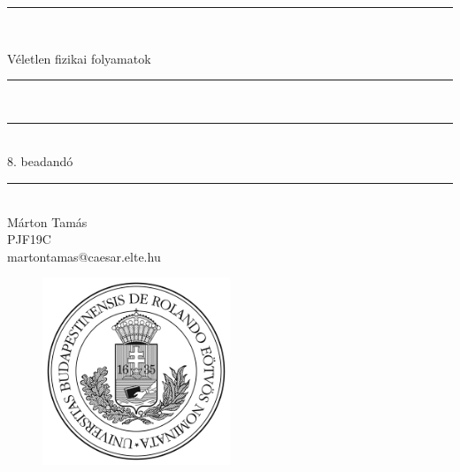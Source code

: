 \documentclass[a4paper, 12pt]{article}
\numberwithin{equation}{section}          %
\numberwithin{figure}{subsection}
\begin{document}
\begin{titlepage}   
\begin{center}
\thispagestyle{empty}  

\vspace*{0.7cm}
\rule{\linewidth}{0.5mm} \\[3mm]
\vspace*{0.7cm}

{\LARGE Véletlen fizikai folyamatok}

\vspace*{0.7cm}
\rule{\linewidth}{0.5mm} \\[3mm]
\rule{\linewidth}{0.5mm} \\[3mm]



{\Large 8. beadandó\\}

\vspace*{0.7cm}
\rule{\linewidth}{0.5mm} \\[3mm]
  {\small Márton Tamás} \\[3mm]
{\footnotesize PJF19C} \\
{\footnotesize martontamas@caesar.elte.hu}

  \vspace*{2cm}

\begin{figure}[h!]
\begin{center}
\includegraphics[width=0.5\textwidth]{./elte.png}
\end{center}
\end{figure}

\end{center}
\end{titlepage}
\end{document}
